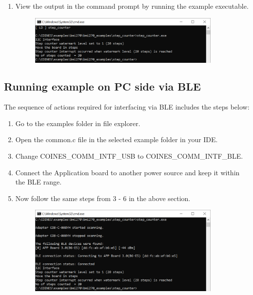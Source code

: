 \documentclass[11pt,headings=small]{scrartcl}
\begin{document}
\begin{enumerate}
\begin{figure}[H]
\begin{center}
		\end{center}
	\end{figure}
	\item View the output in the command prompt by running the example executable.
	\begin{figure}[H]
		\begin{center}
			\includegraphics[width=0.9\textwidth]{coinesAPI_images/Pc_example_output.png}
		\end{center}
	\end{figure}
\end{enumerate}

\subsection{Running example on PC side via BLE}
The sequence of actions required for interfacing via BLE includes the steps below:
\begin{enumerate}
	\item Go to the examples folder in file explorer.
	\item Open the common.c file in the selected example folder in your IDE.
	\item Change COINES\_COMM\_INTF\_USB  to COINES\_COMM\_INTF\_BLE.
	\item Connect the Application board to another power source and keep it within the BLE range.
	\item Now follow the same steps from 3 - 6 in the above section.
	\begin{figure}[H]
		\begin{center}
			\includegraphics[width=0.9\textwidth]{coinesAPI_images/Pc_example_ble_output.png}
		\end{center}
	\end{figure}
\end{enumerate}
\newpage
\end{document}
